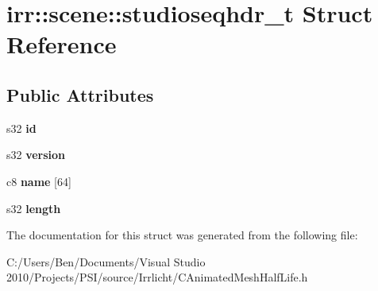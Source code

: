 \hypertarget{structirr_1_1scene_1_1studioseqhdr__t}{\section{irr\-:\-:scene\-:\-:studioseqhdr\-\_\-t Struct Reference}
\label{structirr_1_1scene_1_1studioseqhdr__t}
}
\subsection*{Public Attributes}
\begin{DoxyCompactItemize}
\item 
\hypertarget{structirr_1_1scene_1_1studioseqhdr__t_a7195b3b0b9b01e47c95dc1420e9699ce}{s32 {\bfseries id}}\label{structirr_1_1scene_1_1studioseqhdr__t_a7195b3b0b9b01e47c95dc1420e9699ce}

\item 
\hypertarget{structirr_1_1scene_1_1studioseqhdr__t_ac842b2640b5ed73305ef940858da5aa7}{s32 {\bfseries version}}\label{structirr_1_1scene_1_1studioseqhdr__t_ac842b2640b5ed73305ef940858da5aa7}

\item 
\hypertarget{structirr_1_1scene_1_1studioseqhdr__t_a06e736ea06272adc4e7245afb7710bec}{c8 {\bfseries name} \mbox{[}64\mbox{]}}\label{structirr_1_1scene_1_1studioseqhdr__t_a06e736ea06272adc4e7245afb7710bec}

\item 
\hypertarget{structirr_1_1scene_1_1studioseqhdr__t_ae99e0972ca542051f5742c6f0a16ea6f}{s32 {\bfseries length}}\label{structirr_1_1scene_1_1studioseqhdr__t_ae99e0972ca542051f5742c6f0a16ea6f}

\end{DoxyCompactItemize}


The documentation for this struct was generated from the following file\-:\begin{DoxyCompactItemize}
\item 
C\-:/\-Users/\-Ben/\-Documents/\-Visual Studio 2010/\-Projects/\-P\-S\-I/source/\-Irrlicht/C\-Animated\-Mesh\-Half\-Life.\-h\end{DoxyCompactItemize}
